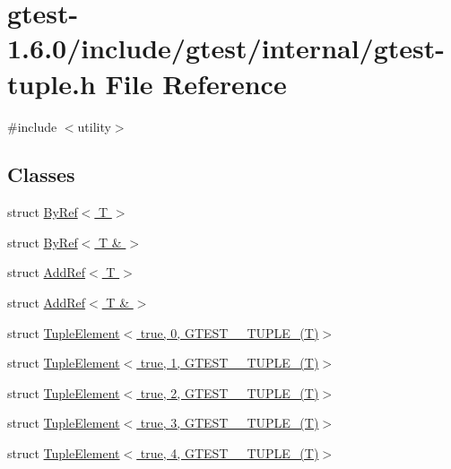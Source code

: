 \hypertarget{gtest-tuple_8h}{\section{gtest-\/1.6.0/include/gtest/internal/gtest-\/tuple.h \-File \-Reference}
\label{d1/d63/gtest-tuple_8h}
}
{\ttfamily \#include $<$utility$>$}\*
\subsection*{\-Classes}
\begin{DoxyCompactItemize}
\item 
struct \hyperlink{structstd_1_1tr1_1_1gtest__internal_1_1ByRef}{\-By\-Ref$<$ T $>$}
\item 
struct \hyperlink{structstd_1_1tr1_1_1gtest__internal_1_1ByRef_3_01T_01_6_01_4}{\-By\-Ref$<$ T \& $>$}
\item 
struct \hyperlink{structstd_1_1tr1_1_1gtest__internal_1_1AddRef}{\-Add\-Ref$<$ T $>$}
\item 
struct \hyperlink{structstd_1_1tr1_1_1gtest__internal_1_1AddRef_3_01T_01_6_01_4}{\-Add\-Ref$<$ T \& $>$}
\item 
struct \hyperlink{structstd_1_1tr1_1_1gtest__internal_1_1TupleElement_3_01true_00_010_00_01GTEST__10__TUPLE___07T_08_4}{\-Tuple\-Element$<$ true, 0, G\-T\-E\-S\-T\-\_\-\_\-\-T\-U\-P\-L\-E\-\_\-(\-T)$>$}
\item 
struct \hyperlink{structstd_1_1tr1_1_1gtest__internal_1_1TupleElement_3_01true_00_011_00_01GTEST__10__TUPLE___07T_08_4}{\-Tuple\-Element$<$ true, 1, G\-T\-E\-S\-T\-\_\-\_\-\-T\-U\-P\-L\-E\-\_\-(\-T)$>$}
\item 
struct \hyperlink{structstd_1_1tr1_1_1gtest__internal_1_1TupleElement_3_01true_00_012_00_01GTEST__10__TUPLE___07T_08_4}{\-Tuple\-Element$<$ true, 2, G\-T\-E\-S\-T\-\_\-\_\-\-T\-U\-P\-L\-E\-\_\-(\-T)$>$}
\item 
struct \hyperlink{structstd_1_1tr1_1_1gtest__internal_1_1TupleElement_3_01true_00_013_00_01GTEST__10__TUPLE___07T_08_4}{\-Tuple\-Element$<$ true, 3, G\-T\-E\-S\-T\-\_\-\_\-\-T\-U\-P\-L\-E\-\_\-(\-T)$>$}
\item 
struct \hyperlink{structstd_1_1tr1_1_1gtest__internal_1_1TupleElement_3_01true_00_014_00_01GTEST__10__TUPLE___07T_08_4}{\-Tuple\-Element$<$ true, 4, G\-T\-E\-S\-T\-\_\-\_\-\-T\-U\-P\-L\-E\-\_\-(\-T)$>$}
\item 

\end{DoxyCompactItemize}
